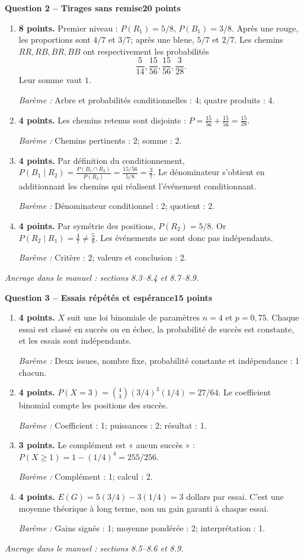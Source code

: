 \documentclass[11pt,a4paper]{article}
\begin{document}
\newpage
{\large\bfseries Question 2 -- Tirages sans remise}\hfill\textbf{20 points}\par
\begin{enumerate}
\item \textbf{8 points.} Premier niveau : \(P(R_1)=5/8\), \(P(B_1)=3/8\). Après une rouge, les proportions sont \(4/7\) et \(3/7\); après une bleue, \(5/7\) et \(2/7\). Les chemins \(RR,RB,BR,BB\) ont respectivement les probabilités \[\frac5{14},\frac{15}{56},\frac{15}{56},\frac3{28}.\] Leur somme vaut \(1\).
\par{\small\textit{Barème : }Arbre et probabilités conditionnelles : 4; quatre produits : 4.}
\item \textbf{4 points.} Les chemins retenus sont disjoints : \(P=\frac{15}{56}+\frac{15}{56}=\frac{15}{28}\).
\par{\small\textit{Barème : }Chemins pertinents : 2; somme : 2.}
\item \textbf{4 points.} Par définition du conditionnement, \(P(B_1\mid R_2)=\frac{P(B_1\cap R_2)}{P(R_2)}=\frac{15/56}{5/8}=\frac37\). Le dénominateur s’obtient en additionnant les chemins qui réalisent l’événement conditionnant.
\par{\small\textit{Barème : }Dénominateur conditionnel : 2; quotient : 2.}
\item \textbf{4 points.} Par symétrie des positions, \(P(R_2)=5/8\). Or \(P(R_2\mid R_1)=\frac47\ne\frac58\). Les événements ne sont donc pas indépendants.
\par{\small\textit{Barème : }Critère : 2; valeurs et conclusion : 2.}
\end{enumerate}
\vfill {\small\textit{Ancrage dans le manuel : sections 8.3--8.4 et 8.7--8.9.}}

\newpage
{\large\bfseries Question 3 -- Essais répétés et espérance}\hfill\textbf{15 points}\par
\begin{enumerate}
\item \textbf{4 points.} \(X\) suit une loi binomiale de paramètres \(n=4\) et \(p=0{,}75\). Chaque essai est classé en succès ou en échec, la probabilité de succès est constante, et les essais sont indépendants.
\par{\small\textit{Barème : }Deux issues, nombre fixe, probabilité constante et indépendance : 1 chacun.}
\item \textbf{4 points.} \(P(X=3)=\binom43(3/4)^3(1/4)=27/64\). Le coefficient binomial compte les positions des succès.
\par{\small\textit{Barème : }Coefficient : 1; puissances : 2; résultat : 1.}
\item \textbf{3 points.} Le complément est « aucun succès » : \(P(X\ge1)=1-(1/4)^4=255/256\).
\par{\small\textit{Barème : }Complément : 1; calcul : 2.}
\item \textbf{4 points.} \(E(G)=5(3/4)-3(1/4)=3\) dollars par essai. C’est une moyenne théorique à long terme, non un gain garanti à chaque essai.
\par{\small\textit{Barème : }Gains signés : 1; moyenne pondérée : 2; interprétation : 1.}
\end{enumerate}
\vfill {\small\textit{Ancrage dans le manuel : sections 8.5--8.6 et 8.9.}}
\end{document}

